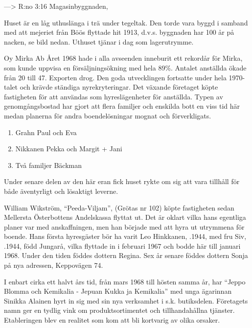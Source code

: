 --->  R:no 3:16 	Magasinbyggnaden, 

Huset är en låg uthuslänga i trä under tegeltak. Den torde vara byggd i samband med att mejeriet från Böös flyttade hit 1913, d.v.s. byggnaden har 100 år på nacken, se bild nedan. Uthuset tjänar i dag som lagerutrymme.



Oy Mirka Ab	Året 1968 hade i alla avseenden inneburit ett rekordår för Mirka, som kunde uppvisa en försäljningsökning med hela 89\%. Antalet anställda ökade från 20 till 47. Exporten drog. Den goda utvecklingen fortsatte under hela 1970-talet och krävde ständiga nyrekryteringar. Det växande företaget köpte fastigheten för att användas som hyreslägenheter för anställda. Typen av genomgångsbostad har gjort att flera familjer och enskilda bott en viss tid här medan planerna för andra boendelösningar mognat och förverkligats.
\begin{enumerate}
  \item Grahn Paul och Eva
  \item Nikkanen Pekka och Margit + Jani
  \item Två familjer Bäckman
\end{enumerate}

Under senare delen av den här eran fick huset rykte om sig att vara tillhåll för både äventyrligt och lösaktigt leverne.



William Wikström, ``Peeda-Viljam'', (Grötas nr 102) köpte fastigheten sedan Mellersta Österbottens Andelskassa flyttat ut. Det är oklart vilka hans egentliga planer var med anskaffningen, men han började med att hyra ut utrymmena för boende. Hans första hyresgäster bör ha varit Leo Hinkkanen, .1944, med fru Siv, .1944, född Jungarå, vilka flyttade in i februari 1967 och bodde här till januari 1968. Under den tiden föddes dottern Regina. Sex år senare föddes dottern Sonja på nya adressen, Keppovägen 74.

I enbart cirka ett halvt års tid, från mars 1968 till hösten samma år, har ``Jeppo Blomma och Kemikalia - Jepuan Kukka ja Kemikalia'' 	med unga ägarinnan Sinikka Alainen hyrt in sig med sin nya verksamhet i s.k. butiksdelen. Företagets namn ger en tydlig vink om produktsortimentet och tillhandahållna tjänster. Etableringen blev en realitet som kom att bli kortvarig av olika orsaker.

